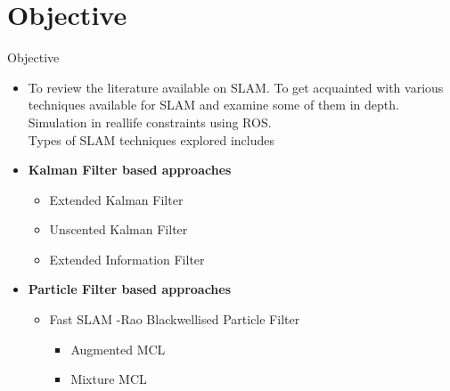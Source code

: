 \documentclass{beamer}
\begin{document}
\section{Objective}
\begin{frame}{Objective}
    \begin{itemize}
        \item To review the literature available on SLAM. To get acquainted with various techniques available for SLAM and examine some of them in depth. Simulation in reallife constraints using ROS.\\
            Types of SLAM techniques explored includes
        \item \textbf{Kalman Filter based approaches}
            \begin{itemize}
                \item Extended Kalman Filter
                \item Unscented Kalman Filter
                \item Extended Information Filter
            \end{itemize}
            \item \textbf{Particle Filter based approaches}
                \begin{itemize}
                    \item Fast SLAM -Rao Blackwellised Particle Filter
                        \begin{itemize}
                            \item Augmented MCL
                            \item Mixture MCL
                        \end{itemize}
                \end{itemize}
       \end{itemize}
\vfill
\end{frame}
\end{document}
